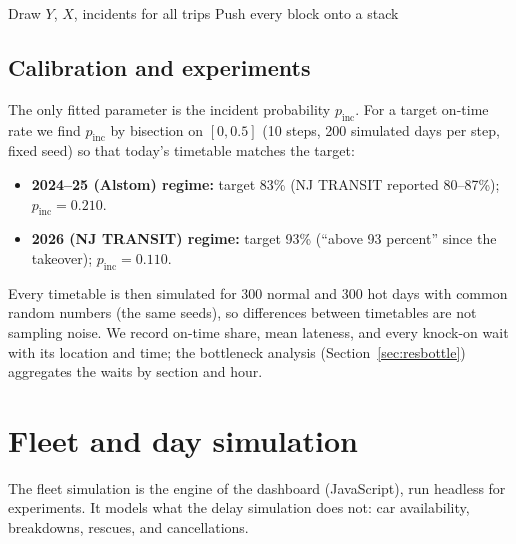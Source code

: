 \documentclass[11pt]{article}
\begin{document}
\begin{algorithm}[ht]
\caption{One simulated day of delay propagation}\label{alg:delay}
Draw $Y$, $X$, incidents for all trips\;
Push every block onto a stack\;
\end{algorithm}

\subsection{Calibration and experiments}
The only fitted parameter is the incident probability $p_{\text{inc}}$. For a target on-time rate we find $p_{\text{inc}}$ by bisection on $[0,0.5]$ (10 steps, 200 simulated days per step, fixed seed) so that today's timetable matches the target:
\begin{itemize}
\item \textbf{2024--25 (Alstom) regime:} target 83\% (NJ TRANSIT reported 80--87\%); $p_{\text{inc}}=0.210$.
\item \textbf{2026 (NJ TRANSIT) regime:} target 93\% (``above 93 percent'' since the takeover); $p_{\text{inc}}=0.110$.
\end{itemize}
Every timetable is then simulated for 300 normal and 300 hot days with common random numbers (the same seeds), so differences between timetables are not sampling noise. We record on-time share, mean lateness, and every knock-on wait with its location and time; the bottleneck analysis (Section~\ref{sec:resbottle}) aggregates the waits by section and hour.

\section{Fleet and day simulation}\label{sec:fleet}
The fleet simulation is the engine of the dashboard (JavaScript), run headless for experiments. It models what the delay simulation does not: car availability, breakdowns, rescues, and cancellations.
\end{document}
